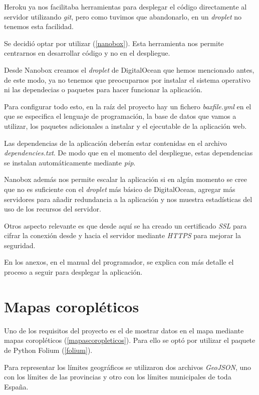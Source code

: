 Heroku ya nos facilitaba herramientas para desplegar el código directamente al servidor utilizando \textit{git}, pero como tuvimos que abandonarlo, en un \textit{droplet} no tenemos esta facilidad.

Se decidió optar por utilizar  (\ref{nanobox}). Esta herramienta nos permite centrarnos en desarrollar código y no en el despliegue.

Desde Nanobox creamos el \textit{droplet} de DigitalOcean que hemos mencionado antes, de este modo, ya no tenemos que preocuparnos por instalar el sistema operativo ni las dependecias o paquetes para hacer funcionar la aplicación.

Para configurar todo esto, en la raíz del proyecto hay un fichero \textit{baxfile.yml} en el que se especifica el lenguaje de programación, la base de datos que vamos a utilizar, los paquetes adicionales a instalar y el ejecutable de la aplicación web.

Las dependencias de la aplicación deberán estar contenidas en el archivo \textit{dependencies.txt}. De modo que en el momento del despliegue, estas dependencias se instalan automáticamente mediante \textit{pip}.

Nanobox además nos permite escalar la aplicación si en algún momento se cree que no es suficiente con el \textit{droplet} más básico de DigitalOcean, agregar más servidores para añadir redundancia a la aplicación y nos muestra estadísticas del uso de los recursos del servidor.

Otros aspecto relevante es que desde aquí se ha creado un certificado \textit{SSL} para cifrar la conexión  desde y hacia el servidor mediante \textit{HTTPS} para mejorar la seguridad.

En los anexos, en el manual del programador, se explica con más detalle el proceso a seguir para desplegar la aplicación.

\section{Mapas coropléticos}

Uno de los requisitos del proyecto es el de mostrar datos en el mapa mediante mapas coropléticos (\ref{mapascoropleticos}). Para ello se optó por utilizar el paquete de Python Folium (\ref{folium}).

Para representar los límites geográficos se utilizaron dos archivos \textit{GeoJSON}, uno con los límites de las provincias y otro con los límites municipales de toda España.

